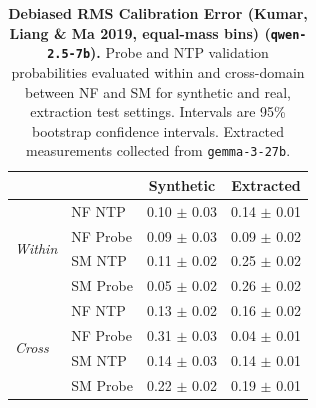 \begin{table}[ht]
\centering
\begin{tabular}{ll cc}
\toprule
& & Synthetic & Extracted \\
\midrule
\multirow{4}{*}{\textit{Within}}
& NF NTP & 0.10 $\pm$ 0.03 & 0.14 $\pm$ 0.01 \\
& NF Probe & 0.09 $\pm$ 0.03 & 0.09 $\pm$ 0.02 \\
& SM NTP & 0.11 $\pm$ 0.02 & 0.25 $\pm$ 0.02 \\
& SM Probe & 0.05 $\pm$ 0.02 & 0.26 $\pm$ 0.02 \\
\midrule
\multirow{4}{*}{\textit{Cross}}
& NF NTP & 0.13 $\pm$ 0.02 & 0.16 $\pm$ 0.02 \\
& NF Probe & 0.31 $\pm$ 0.03 & 0.04 $\pm$ 0.01 \\
& SM NTP & 0.14 $\pm$ 0.03 & 0.14 $\pm$ 0.01 \\
& SM Probe & 0.22 $\pm$ 0.02 & 0.19 $\pm$ 0.01 \\
\bottomrule
\end{tabular}
\caption{\textbf{Debiased RMS Calibration Error (Kumar, Liang \& Ma 2019, equal-mass bins) (\texttt{qwen-2.5-7b}).} Probe and NTP validation probabilities evaluated within and cross-domain between NF and SM for synthetic and real, extraction test settings. Intervals are 95\% bootstrap confidence intervals. Extracted measurements collected from \texttt{gemma-3-27b}.}
\label{tab:qwen-2.5-7b-gemma-3-27b-nfix_supermat-rmsce_db}
\end{table}
